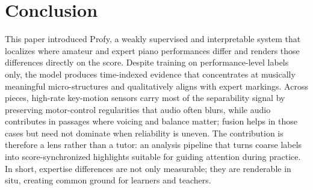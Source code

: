 \documentclass[sigconf,review,anonymous]{acmart}
\begin{document}

\section{Conclusion}

This paper introduced Profy, a weakly supervised and interpretable system that localizes where amateur and expert piano performances differ and renders those differences directly on the score. Despite training on performance-level labels only, the model produces time-indexed evidence that concentrates at musically meaningful micro-structures and qualitatively aligns with expert markings. Across pieces, high-rate key-motion sensors carry most of the separability signal by preserving motor-control regularities that audio often blurs, while audio contributes in passages where voicing and balance matter; fusion helps in those cases but need not dominate when reliability is uneven. The contribution is therefore a lens rather than a tutor: an analysis pipeline that turns coarse labels into score-synchronized highlights suitable for guiding attention during practice. In short, expertise differences are not only measurable; they are renderable in situ, creating common ground for learners and teachers.


% 




\end{document}
